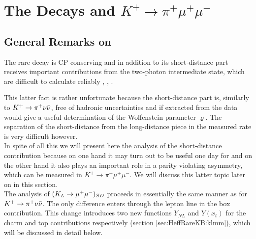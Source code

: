 \section{The Decays \klmm and $K^+\to\pi^+\mu^+\mu^-$}
\label{sec:KLmm}
\subsection{General Remarks on \klmm}
\label{sec:KLmm:GeneralKL}
The rare decay \klmm is CP conserving and in addition to its
short-distance part receives important contributions from the
two-photon intermediate state, which are difficult to calculate
reliably \cite{gengng:90}, \cite{belangergeng:91}, \cite{ko:92}.

This latter fact is rather unfortunate because the
short-distance part is, similarly to $K^+ \to \pi^+\nu\bar\nu$, free of hadronic
uncertainties and if extracted from the data would give a useful
determination of the Wolfenstein parameter $\varrho$. The separation
of the short-distance from the long-distance piece in the measured
rate is very difficult however.
\\
In spite of all this we will present here the analysis of the short-distance
contribution because on one hand it may turn out to be useful
one day for \klmm and on the other hand it also plays an important
role in a parity violating asymmetry, which can be measured in
$K^+\to\pi^+\mu^+\mu^-$. We will discuss this latter topic later on in
this section.
\\
The analysis of $(K_L \to \mu^+\mu^-)_{SD}$ proceeds in essentially the same
manner as for $K^+ \to \pi^+\nu\bar\nu$. The only difference enters through the lepton
line in the box contribution. This change introduces two new
functions $Y_{NL}$ and $Y(x_t)$ for the charm and top
contributions respectively (section \ref{sec:HeffRareKB:klmm}),
which will be discussed in detail below.

